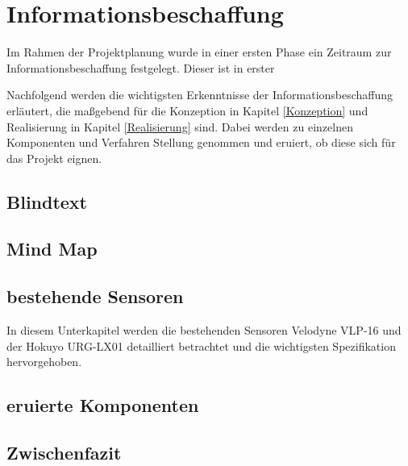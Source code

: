 \chapter{Informationsbeschaffung}

Im Rahmen der Projektplanung wurde in einer ersten Phase ein Zeitraum zur Informationsbeschaffung festgelegt. Dieser ist in erster  

Nachfolgend werden die wichtigsten Erkenntnisse der Informationsbeschaffung erläutert, die maßgebend für die Konzeption in Kapitel \ref{Konzeption} und Realisierung in Kapitel \ref{Realisierung} sind. Dabei werden zu einzelnen Komponenten und Verfahren Stellung genommen und eruiert, ob diese sich für das Projekt eignen.

\section{Blindtext}

\blinditemize

\section {Mind Map}
\label{Mind Map}

\section{bestehende Sensoren}
\label{bestehende_Sensoren}
In diesem Unterkapitel werden die bestehenden Sensoren Velodyne VLP-16 und der Hokuyo URG-LX01 detailliert betrachtet und die wichtigsten Spezifikation hervorgehoben.  

\section{eruierte Komponenten}
\label{eruierte_Komponenten}


\section{Zwischenfazit}
\label{Zwischenfazit_Info}